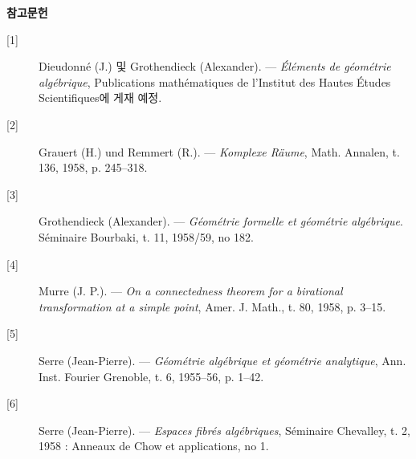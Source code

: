 \begin{center}
  \textbf{참고문헌}
\end{center}

\begin{description}
  \item[{[1]}] Dieudonn\'e (J.) 및 Grothendieck (Alexander). --- \emph{Éléments
    de géométrie algébrique}, Publications mathématiques de l'Institut des
    Hautes Études Scientifiques에 게재 예정.
  \item[{[2]}] Grauert (H.) und Remmert (R.). --- \emph{Komplexe Räume}, Math.
    Annalen, t. 136, 1958, p. 245--318.
  \item[{[3]}] Grothendieck (Alexander). --- \emph{Géométrie formelle et
    géométrie algébrique}. Séminaire Bourbaki, t. 11, 1958/59, no 182.
  \item[{[4]}] Murre (J. P.). --- \emph{On a connectedness theorem for a
    birational transformation at a simple point}, Amer. J. Math., t. 80, 1958,
    p. 3--15.
  \item[{[5]}] Serre (Jean-Pierre). --- \emph{Géométrie algébrique et géométrie
    analytique}, Ann. Inst. Fourier Grenoble, t. 6, 1955--56, p. 1--42.
  \item[{[6]}] Serre (Jean-Pierre). --- \emph{Espaces fibrés algébriques},
    Séminaire Chevalley, t. 2, 1958 : Anneaux de Chow et applications, no 1.
\end{description}

